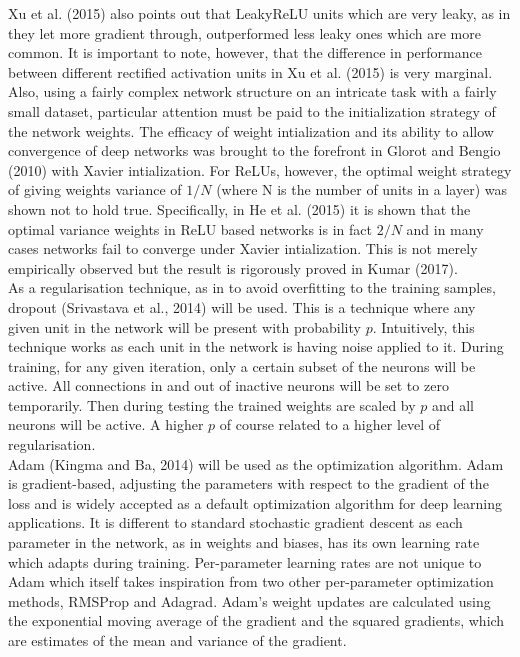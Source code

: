\documentclass{article}
\begin{document}
Xu et al. (2015) also points out that LeakyReLU units which are very leaky, as in they let more gradient through, outperformed less leaky ones which are more common. It is important to note, however, that the difference in performance between different rectified activation units in Xu et al. (2015) is very marginal.\\

Also, using a fairly complex network structure on an intricate task with a fairly small dataset, particular attention must be paid to the initialization strategy of the network weights. The efficacy of weight intialization and its ability to allow convergence of deep networks was brought to the forefront in Glorot and Bengio (2010) with Xavier intialization. For ReLUs, however, the optimal weight strategy of giving weights variance of $1/N$ (where N is the number of units in a layer) was shown not to hold true. Specifically, in He et al. (2015) it is shown that the optimal variance weights in ReLU based networks is in fact $2/N$ and in many cases networks fail to converge under Xavier intialization. This is not merely empirically observed but the result is rigorously proved in Kumar (2017).\\

As a regularisation technique, as in to avoid overfitting to the training samples, dropout (Srivastava et al., 2014) will be used. This is a technique where any given unit in the network will be present with probability $p$. Intuitively, this technique works as each unit in the network is having noise applied to it. During training, for any given iteration, only a certain subset of the neurons will be active. All connections in and out of inactive neurons will be set to zero temporarily. Then during testing the trained weights are scaled by $p$ and all neurons will be active. A higher $p$ of course related to a higher level of regularisation.\\

Adam (Kingma and Ba, 2014) will be used as the optimization algorithm. Adam is gradient-based, adjusting the parameters with respect to the gradient of the loss and is widely accepted as a default optimization algorithm for deep learning applications. It is different to standard stochastic gradient descent as each parameter in the network, as in weights and biases, has its own learning rate which adapts during training. Per-parameter learning rates are not unique to Adam which itself takes inspiration from two other per-parameter optimization methods, RMSProp and Adagrad. Adam's weight updates are calculated using the exponential moving average of the gradient and the squared gradients, which are estimates of the mean and variance of the gradient. \\
\end{document}

